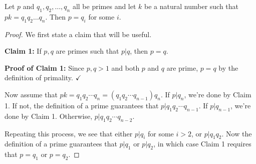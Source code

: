 \documentclass[english,course]{lecture}
\theoremstyle{plain}
\def\N{{\mathbb N}}
\def\presnotes{}
\begin{document}
\presnotes



\begin{lemma}
	Let $p$ and $q_1, q_2,\ldots, q_n$ all be primes and let $k$ be a natural number such that $pk = q_1 q_2 \ldots q_n$.
	Then $p = q_i$ for some $i$.
\end{lemma}


\begin{proof}
	We first state a claim that will be useful.
	

	
\noindent	\textbf{Claim 1:} If $p,q$ are primes such that $p|q$, then $p = q$.
	
\noindent	\textbf{Proof of Claim 1:} Since $p, q > 1$ and both $p$ and $q$ are prime, $p = q$ by the definition of primality. \hfill $\checkmark$ %
	



	



	
	
	Now assume that $pk = q_1 q_2 \cdots q_n = (q_1 q_2 \cdots q_{n-1}) q_n$.
	If $p|q_n$, we're done by Claim 1.
	If not, the definition of a prime guarantees that $p| q_1 q_2 \cdots q_{n-1}$.
	If $p|q_{n-1}$, we're done by Claim 1.
	Otherwise, $p|q_1 q_2 \cdots q_{n-2}$.
	
	Repeating this process, we see that either $p|q_i$ for some $i > 2$, or $p|q_1 q_2$.
	Now the definition of a prime guarantees that $p|q_1$ or $p|q_2$, in which case Claim 1 requires that $p = q_1$ or $p = q_2$.
\end{proof}

\presnotes
\end{document}
